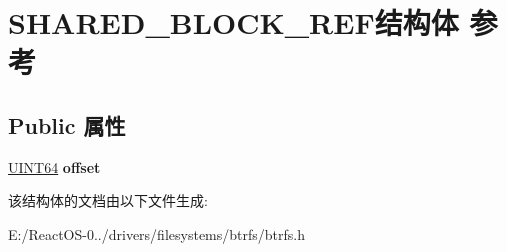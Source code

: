 \hypertarget{struct_s_h_a_r_e_d___b_l_o_c_k___r_e_f}{}\section{S\+H\+A\+R\+E\+D\+\_\+\+B\+L\+O\+C\+K\+\_\+\+R\+E\+F结构体 参考}
\label{struct_s_h_a_r_e_d___b_l_o_c_k___r_e_f}
\subsection*{Public 属性}
\begin{DoxyCompactItemize}
\item 
\mbox{\label{struct_s_h_a_r_e_d___b_l_o_c_k___r_e_f_ad330923525af002606f80c5384d72198}} 
\hyperlink{_processor_bind_8h_a57be03562867144161c1bfee95ca8f7c}{U\+I\+N\+T64} {\bfseries offset}
\end{DoxyCompactItemize}


该结构体的文档由以下文件生成\+:\begin{DoxyCompactItemize}
\item 
E\+:/\+React\+O\+S-\/0../drivers/filesystems/btrfs/btrfs.\+h\end{DoxyCompactItemize}
